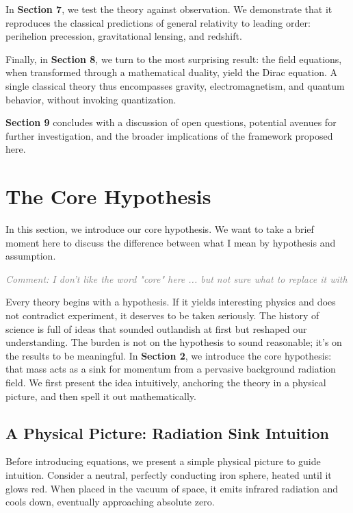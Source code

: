 \documentclass {article}
\newcommand{\comment}[1]{\textcolor{gray}{\small\textit{Comment: #1}}}
\begin{document}
In \textbf{Section 7}, we test the theory against observation. We demonstrate that it reproduces the classical predictions of general relativity to leading order: perihelion precession, gravitational lensing, and redshift.

Finally, in \textbf{Section 8}, we turn to the most surprising result: the field equations, when transformed through a mathematical duality, yield the Dirac equation. A single classical theory thus encompasses gravity, electromagnetism, and quantum behavior, without invoking quantization.

\textbf{Section 9} concludes with a discussion of open questions, potential avenues for further investigation, and the broader implications of the framework proposed here.

\section{The Core Hypothesis}

In this section, we introduce our core hypothesis. We want to take a brief moment here to discuss the difference between what I mean by hypothesis and assumption. 

\comment{I don't like the word "core" here ... but not sure what to replace it with}

Every theory begins with a hypothesis. If it yields interesting physics and does not contradict experiment, it deserves to be taken seriously. The history of science is full of ideas that sounded outlandish at first but reshaped our understanding. The burden is not on the hypothesis to sound reasonable; it’s on the results to be meaningful. In \textbf{Section 2}, we introduce the core hypothesis: that mass acts as a sink for momentum from a pervasive background radiation field. We first present the idea intuitively, anchoring the theory in a physical picture, and then spell it out mathematically.


\subsection{A Physical Picture: Radiation Sink Intuition }
\label{subsec:intuition}

Before introducing equations, we present a simple physical picture to guide intuition. Consider a neutral, perfectly conducting iron sphere, heated until it glows red. When placed in the vacuum of space, it emits infrared radiation and cools down, eventually approaching absolute zero.
\end{document}
